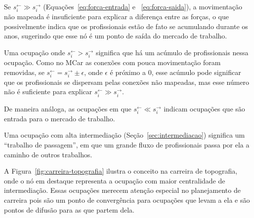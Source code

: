 \documentclass[12pt,a4paper,final]{article}
\newcommand{\linkin}[1]{#1^\leftarrow} %
\newcommand{\linkout}[1]{#1^\rightarrow} %
\begin{document}
\begin{hypothesis}
    Se $\linkin{s}_i \gg \linkout{s}_i$ (Equações~\ref{eq:forca-entrada} e ~\ref{eq:forca-saida}), a movimentação não mapeada é insuficiente para explicar a diferença entre as forças, o que possivelmente indica que os profissionais estão de fato se acumulando durante os anos, sugerindo que esse nó é um ponto de saída do mercado de trabalho.
\end{hypothesis}

Uma ocupação onde $\linkin{s}_i > \linkout{s}_i$ significa que há um acúmulo de profissionais nessa ocupação. Como no MCar as conexões com pouca movimentação foram removidas, se $\linkin{s}_i = \linkout{s}_i \pm \epsilon$, onde $\epsilon$ é próximo a 0, esse acúmulo pode significar que os profissionais se dispersam pelas conexões não mapeadas, mas esse número não é suficiente para explicar $\linkin{s}_i \gg \linkout{s}_i$.

\begin{hypothesis}
    De maneira análoga, as ocupações em que $\linkin{s}_i \ll \linkout{s}_i$ indicam ocupações que são entrada para o mercado de trabalho.
\end{hypothesis}

\begin{hypothesis}
    Uma ocupação com alta intermediação (Seção~\ref{sec:intermediacao}) significa um \enquote{trabalho de passagem}, em que um grande fluxo de profissionais passa por ela a caminho de outros trabalhos.
\end{hypothesis}

A Figura~\ref{fig:carreira-topografia} ilustra o conceito na carreira de topografia, onde o nó em destaque representa a ocupação com maior centralidade de intermediação. Essas ocupações merecem atenção especial no planejamento de carreira pois são um ponto de convergência para ocupações que levam a ela e são pontos de difusão para as que partem dela.
\end{document}
